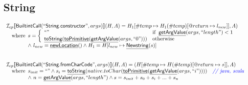 \documentclass{article}
\makeatletter
\newcommand{\SF}[1]{\mbox{\textsf{#1}}}
\newcommand{\comment}[1]{\textit{#1}}
\newcommand{\wherec}[1]{{\rm where}\begin{array}[t]{l}#1\end{array}}
\newcommand{\ifc}[1]{{\rm if}\begin{array}[t]{l}#1\end{array}}
\newcommand{\owc}{{\rm otherwise}}
\newcommand{\I}{\mathcal{I}}
\newcommand{\lbr}{\llbracket}
\newcommand{\rbr}{\rrbracket}
\newcommand{\hf}[1]{\underline{\sf #1}}
\newcommand{\varloc}[1]{\##1}
\newcommand{\varprop}[1]{@#1}
\def\inblue{\color{blue}}
\def\inblue{\color{blue}}
\makeatother
\begin{document}
\subsection{String}
\[
\begin{array}{l}
\I _{cp}\lbr \SF{BuiltintCall}(``\SF{String.constructor}",args)\rbr(H,A)
 = H_1[\varloc{temp}\mapsto H_1(\varloc{temp})[\varprop{return}\mapsto l_{new}]], A) \\
\quad\wherec{
  s = \left\{\begin{array}{ll}
      ``" & \ifc{\hf{getArgValue}(args,``length") < 1}\\
      \hf{toString}(\hf{toPrimitive}(\hf{getArgValue}(args,``0"))) & \owc
    \end{array}\right.\\
  \land\ l_{new} = \hf{newLocation}()\land H_1 = H[l_{new} \mapsto \hf{Newstring}(s)]
  }\\
\\\\


\I _{cp}\lbr \SF{BuiltintCall}(``\SF{String.fromCharCode}",args)\rbr(H,A)
 = (H[\varloc{temp}\mapsto H(\varloc{temp})[\varprop{return}\mapsto s]], A) \\
\quad\wherec{
  s_{init} = ``" \land s_i = \hf{toString}(native.toChar(\hf{toPrimitive}(\hf{getArgValue}(args,``i"))))
  \quad\comment{{\inblue // java, scala}}\\
  \land\ n = \hf{getArgValue}(args, ``length") \land s = s_{init} + s_0 + s_i + ... + s_n
  }\\
\end{array}
\]
\end{document}
